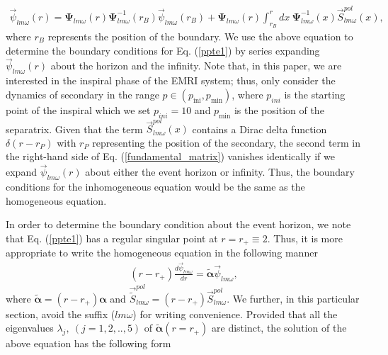 \documentclass[11pt]{article}
\begin{document}
\begin{equation}\label{fundamental_matrix}
    \begin{aligned}
        \vec{\psi}_{lm\omega}(r)=\boldsymbol{\Psi}_{lm\omega}(r)\boldsymbol{\Psi}_{lm\omega}^{-1}(r_B)\vec{\psi}_{lm\omega}(r_B)+\boldsymbol{\Psi}_{lm\omega}(r)\int_{r_B}^{r}dx~\boldsymbol{\Psi}^{-1}_{lm\omega}(x) \vec{S}^{pol}_{lm\omega}(x),
    \end{aligned}
\end{equation}
where $r_B$ represents the position of the boundary. We use the above equation to determine the boundary conditions for Eq. (\ref{ppte1}) by series expanding $\vec{\psi}_{lm\omega}(r)$ about the horizon and the infinity. Note that, in this paper, we are interested in the inspiral phase of the EMRI system; thus, only consider the dynamics of secondary in the range $p\in (p_{\textrm{ini}},p_{\textrm{min}})$, where $p_{ini}$ is the starting point of the inspiral which we set $p_{ini}=10$ and $p_{\textrm{min}}$ is the position of the separatrix. Given that the term $\vec{S}^{pol}_{lm\omega}(x)$ contains a Dirac delta function $\delta(r-r_P)$ with $r_P$ representing the position of the secondary, the second term in the right-hand side of Eq. (\ref{fundamental_matrix}) vanishes identically if we expand $\vec{\psi}_{lm\omega}(r)$ about either the event horizon or infinity. Thus, the boundary conditions for the inhomogeneous equation would be the same as the homogeneous equation.\par
In order to determine the boundary condition about the event horizon, we note that Eq. (\ref{ppte1}) has a regular singular point at $r=r_+\equiv 2$. Thus, it is more appropriate to write the homogeneous equation in the following manner
\begin{align}\label{ppte2}
 (r-r_+) \frac{d\vec{\psi}_{lm\omega}}{dr}=\tilde{\boldsymbol{\alpha}}\vec{\psi}_{lm\omega} ,
\end{align}
where $\tilde{\boldsymbol{\alpha}}=(r-r_+)\boldsymbol{\alpha}$ and $\vec{\tilde{S}}^{pol}_{lm\omega}=(r-r_+)\vec{S}^{pol}_{lm\omega}$. We further, in this particular section, avoid the suffix ($lm\omega$) for writing convenience. Provided that all the eigenvalues $\lambda_j,~(j=1,2,..,5)$ of $\tilde{\boldsymbol{\alpha}}(r=r_+)$ are distinct, the solution of the above equation has the following form \cite{wasow1965asymptotic}
\end{document}
